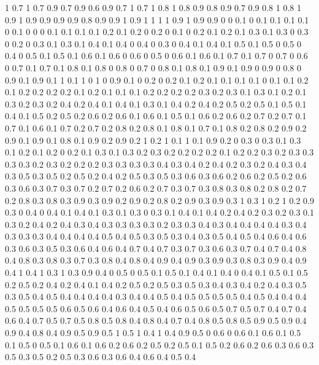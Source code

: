 1 0.7
1 0.7
0.9 0.7
0.9 0.6
0.9 0.7
1 0.7
1 0.8
1 0.8
0.9 0.8
0.9 0.7
0.9 0.8
1 0.8
1 0.9
1 0.9
0.9 0.9
0.9 0.8
0.9 0.9
1 0.9
1 1
1 1
0.9 1
0.9 0.9
0 0
0.1 0
0.1 0.1
0.1 0.1
0 0.1
0 0
0 0.1
0.1 0.1
0.1 0.2
0.1 0.2
0 0.2
0 0.1
0 0.2
0.1 0.2
0.1 0.3
0.1 0.3
0 0.3
0 0.2
0 0.3
0.1 0.3
0.1 0.4
0.1 0.4
0 0.4
0 0.3
0 0.4
0.1 0.4
0.1 0.5
0.1 0.5
0 0.5
0 0.4
0 0.5
0.1 0.5
0.1 0.6
0.1 0.6
0 0.6
0 0.5
0 0.6
0.1 0.6
0.1 0.7
0.1 0.7
0 0.7
0 0.6
0 0.7
0.1 0.7
0.1 0.8
0.1 0.8
0 0.8
0 0.7
0 0.8
0.1 0.8
0.1 0.9
0.1 0.9
0 0.9
0 0.8
0 0.9
0.1 0.9
0.1 1
0.1 1
0 1
0 0.9
0.1 0
0.2 0
0.2 0.1
0.2 0.1
0.1 0.1
0.1 0
0.1 0.1
0.2 0.1
0.2 0.2
0.2 0.2
0.1 0.2
0.1 0.1
0.1 0.2
0.2 0.2
0.2 0.3
0.2 0.3
0.1 0.3
0.1 0.2
0.1 0.3
0.2 0.3
0.2 0.4
0.2 0.4
0.1 0.4
0.1 0.3
0.1 0.4
0.2 0.4
0.2 0.5
0.2 0.5
0.1 0.5
0.1 0.4
0.1 0.5
0.2 0.5
0.2 0.6
0.2 0.6
0.1 0.6
0.1 0.5
0.1 0.6
0.2 0.6
0.2 0.7
0.2 0.7
0.1 0.7
0.1 0.6
0.1 0.7
0.2 0.7
0.2 0.8
0.2 0.8
0.1 0.8
0.1 0.7
0.1 0.8
0.2 0.8
0.2 0.9
0.2 0.9
0.1 0.9
0.1 0.8
0.1 0.9
0.2 0.9
0.2 1
0.2 1
0.1 1
0.1 0.9
0.2 0
0.3 0
0.3 0.1
0.3 0.1
0.2 0.1
0.2 0
0.2 0.1
0.3 0.1
0.3 0.2
0.3 0.2
0.2 0.2
0.2 0.1
0.2 0.2
0.3 0.2
0.3 0.3
0.3 0.3
0.2 0.3
0.2 0.2
0.2 0.3
0.3 0.3
0.3 0.4
0.3 0.4
0.2 0.4
0.2 0.3
0.2 0.4
0.3 0.4
0.3 0.5
0.3 0.5
0.2 0.5
0.2 0.4
0.2 0.5
0.3 0.5
0.3 0.6
0.3 0.6
0.2 0.6
0.2 0.5
0.2 0.6
0.3 0.6
0.3 0.7
0.3 0.7
0.2 0.7
0.2 0.6
0.2 0.7
0.3 0.7
0.3 0.8
0.3 0.8
0.2 0.8
0.2 0.7
0.2 0.8
0.3 0.8
0.3 0.9
0.3 0.9
0.2 0.9
0.2 0.8
0.2 0.9
0.3 0.9
0.3 1
0.3 1
0.2 1
0.2 0.9
0.3 0
0.4 0
0.4 0.1
0.4 0.1
0.3 0.1
0.3 0
0.3 0.1
0.4 0.1
0.4 0.2
0.4 0.2
0.3 0.2
0.3 0.1
0.3 0.2
0.4 0.2
0.4 0.3
0.4 0.3
0.3 0.3
0.3 0.2
0.3 0.3
0.4 0.3
0.4 0.4
0.4 0.4
0.3 0.4
0.3 0.3
0.3 0.4
0.4 0.4
0.4 0.5
0.4 0.5
0.3 0.5
0.3 0.4
0.3 0.5
0.4 0.5
0.4 0.6
0.4 0.6
0.3 0.6
0.3 0.5
0.3 0.6
0.4 0.6
0.4 0.7
0.4 0.7
0.3 0.7
0.3 0.6
0.3 0.7
0.4 0.7
0.4 0.8
0.4 0.8
0.3 0.8
0.3 0.7
0.3 0.8
0.4 0.8
0.4 0.9
0.4 0.9
0.3 0.9
0.3 0.8
0.3 0.9
0.4 0.9
0.4 1
0.4 1
0.3 1
0.3 0.9
0.4 0
0.5 0
0.5 0.1
0.5 0.1
0.4 0.1
0.4 0
0.4 0.1
0.5 0.1
0.5 0.2
0.5 0.2
0.4 0.2
0.4 0.1
0.4 0.2
0.5 0.2
0.5 0.3
0.5 0.3
0.4 0.3
0.4 0.2
0.4 0.3
0.5 0.3
0.5 0.4
0.5 0.4
0.4 0.4
0.4 0.3
0.4 0.4
0.5 0.4
0.5 0.5
0.5 0.5
0.4 0.5
0.4 0.4
0.4 0.5
0.5 0.5
0.5 0.6
0.5 0.6
0.4 0.6
0.4 0.5
0.4 0.6
0.5 0.6
0.5 0.7
0.5 0.7
0.4 0.7
0.4 0.6
0.4 0.7
0.5 0.7
0.5 0.8
0.5 0.8
0.4 0.8
0.4 0.7
0.4 0.8
0.5 0.8
0.5 0.9
0.5 0.9
0.4 0.9
0.4 0.8
0.4 0.9
0.5 0.9
0.5 1
0.5 1
0.4 1
0.4 0.9
0.5 0
0.6 0
0.6 0.1
0.6 0.1
0.5 0.1
0.5 0
0.5 0.1
0.6 0.1
0.6 0.2
0.6 0.2
0.5 0.2
0.5 0.1
0.5 0.2
0.6 0.2
0.6 0.3
0.6 0.3
0.5 0.3
0.5 0.2
0.5 0.3
0.6 0.3
0.6 0.4
0.6 0.4
0.5 0.4
